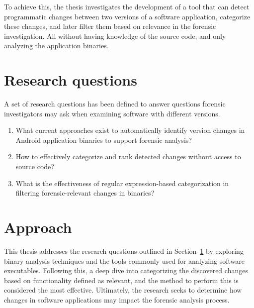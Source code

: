 To achieve this, the thesis investigates the development of a tool that can detect programmatic changes between two versions of a software application, categorize these changes, and later filter them based on relevance in the forensic investigation. All without having knowledge of the source code, and only analyzing the application binaries.

\section{Research questions}
\label{sec:research-questions}

A set of research questions has been defined to answer questions forensic investigators may ask when examining software with different versions.

\begin{enumerate}

    \item What current approaches exist to automatically identify version changes in Android application binaries to support forensic analysis?
    
    \item How to effectively categorize and rank detected changes without access to source code?

    \item What is the effectiveness of regular expression-based categorization in filtering forensic-relevant changes in binaries?

\end{enumerate}



\section{Approach}
\label{sec:approach}

This thesis addresses the research questions outlined in Section~\ref{sec:research-questions} by exploring binary analysis techniques and the tools commonly used for analyzing software executables. Following this, a deep dive into categorizing the discovered changes based on functionality defined as relevant, and the method to perform this is considered the most effective. Ultimately, the research seeks to determine how changes in software applications may impact the forensic analysis process.

